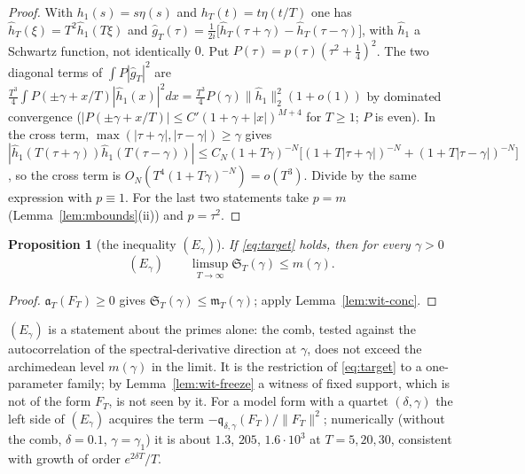 \documentclass[11pt]{amsart}
\newtheorem{proposition}[theorem]{Proposition}
\theoremstyle{definition}
\theoremstyle{remark}
\begin{document}
\begin{proof}
With $h_1(s)=s\eta(s)$ and $h_T(t)=t\eta(t/T)$ one has $\widehat h_T(\xi)=T^2\widehat h_1(T\xi)$ and
$\widehat g_T(\tau)=\frac1{2i}\big[\widehat h_T(\tau+\gamma)-\widehat h_T(\tau-\gamma)\big]$, with $\widehat h_1$ a Schwartz function, not
identically $0$. Put $P(\tau)=p(\tau)(\tau^2+\frac14)^2$. The two diagonal terms of $\int P|\widehat g_T|^2$ are
$\frac{T^3}4\int P(\pm\gamma+x/T)|\widehat h_1(x)|^2dx=\frac{T^3}4P(\gamma)\|\widehat h_1\|_2^2(1+o(1))$ by dominated convergence
($|P(\pm\gamma+x/T)|\le C'(1+\gamma+|x|)^{M+4}$ for $T\ge1$; $P$ is even). In the cross term,
$\max(|\tau+\gamma|,|\tau-\gamma|)\ge\gamma$ gives $|\widehat h_1(T(\tau+\gamma))\widehat h_1(T(\tau-\gamma))|\le C_N(1+T\gamma)^{-N}
\big[(1+T|\tau+\gamma|)^{-N}+(1+T|\tau-\gamma|)^{-N}\big]$, so the cross term is $O_N(T^4(1+T\gamma)^{-N})=o(T^3)$. Divide by the
same expression with $p\equiv1$. For the last two statements take $p=m$ (Lemma~\ref{lem:mbounds}(ii)) and $p=\tau^2$.
\end{proof}

\begin{proposition}[the inequality $(E_\gamma)$]\label{prop:wit-Egamma}
If \eqref{eq:target} holds, then for every $\gamma>0$
\[
(E_\gamma)\qquad\limsup_{T\to\infty}\mathfrak S_T(\gamma)\le m(\gamma).
\]
\end{proposition}

\begin{proof}
$\mathfrak a_T(F_T)\ge0$ gives $\mathfrak S_T(\gamma)\le\mathfrak m_T(\gamma)$; apply Lemma~\ref{lem:wit-conc}.
\end{proof}

$(E_\gamma)$ is a statement about the primes alone: the comb, tested against the autocorrelation of the
spectral-derivative direction at $\gamma$, does not exceed the archimedean level $m(\gamma)$ in the limit. It is the
restriction of \eqref{eq:target} to a one-parameter family; by Lemma~\ref{lem:wit-freeze} a witness of fixed support,
which is not of the form $F_T$, is not seen by it. For a model form with a quartet $(\delta,\gamma)$ the left side of
$(E_\gamma)$ acquires the term $-\mathfrak q_{\delta,\gamma}(F_T)/\|F_T\|^2$; numerically (without the comb, $\delta=0.1$,
$\gamma=\gamma_1$) it is about $1.3$, $205$, $1.6\cdot10^3$ at $T=5,20,30$, consistent with growth of order $e^{2\delta T}/T$.
\end{document}
